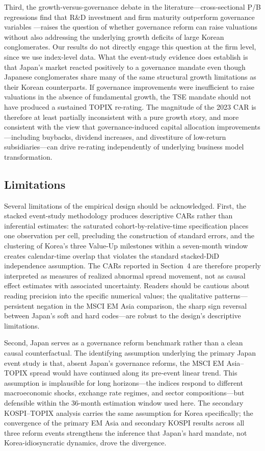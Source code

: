 Third, the growth-versus-governance debate in the literature---cross-sectional P/B regressions find that R\&D investment and firm maturity outperform governance variables \citep{yang_korea_discount_growth_vs_governance, lee_korea_discount_pbr}---raises the question of whether governance reform can raise valuations without also addressing the underlying growth deficits of large Korean conglomerates. Our results do not directly engage this question at the firm level, since we use index-level data. What the event-study evidence does establish is that Japan's market reacted positively to a governance mandate even though Japanese conglomerates share many of the same structural growth limitations as their Korean counterparts. If governance improvements were insufficient to raise valuations in the absence of fundamental growth, the TSE mandate should not have produced a sustained TOPIX re-rating. The magnitude of the 2023 CAR is therefore at least partially inconsistent with a pure growth story, and more consistent with the view that governance-induced capital allocation improvements---including buybacks, dividend increases, and divestiture of low-return subsidiaries---can drive re-rating independently of underlying business model transformation.

\subsection{Limitations}

Several limitations of the empirical design should be acknowledged. First, the stacked event-study methodology produces descriptive CARs rather than inferential estimates: the saturated cohort-by-relative-time specification places one observation per cell, precluding the construction of standard errors, and the clustering of Korea's three Value-Up milestones within a seven-month window creates calendar-time overlap that violates the standard stacked-DiD independence assumption. The CARs reported in Section~4 are therefore properly interpreted as measures of realized abnormal spread movement, not as causal effect estimates with associated uncertainty. Readers should be cautious about reading precision into the specific numerical values; the qualitative patterns---persistent negation in the MSCI EM Asia comparison, the sharp sign reversal between Japan's soft and hard codes---are robust to the design's descriptive limitations.

Second, Japan serves as a governance reform benchmark rather than a clean causal counterfactual. The identifying assumption underlying the primary Japan event study is that, absent Japan's governance reforms, the MSCI EM Asia--TOPIX spread would have continued along its pre-event linear trend. This assumption is implausible for long horizons---the indices respond to different macroeconomic shocks, exchange rate regimes, and sector compositions---but defensible within the 36-month estimation window used here. The secondary KOSPI--TOPIX analysis carries the same assumption for Korea specifically; the convergence of the primary EM Asia and secondary KOSPI results across all three reform events strengthens the inference that Japan's hard mandate, not Korea-idiosyncratic dynamics, drove the divergence.

